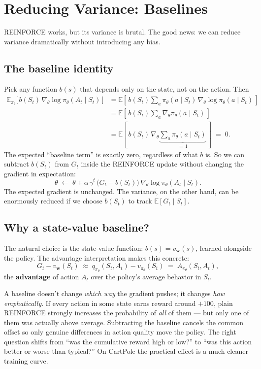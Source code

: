 \documentclass[11pt, oneside]{book}
\newcommand{\E}{\mathbb{E}}              %
\begin{document}
\section{Reducing Variance: Baselines}

REINFORCE works, but its variance is brutal.
The good news: we can reduce variance dramatically without introducing any bias.

\subsection{The baseline identity}

Pick any function $b(s)$ that depends only on the state, not on the action. Then
\begin{align*}
  \E_{\pi_\theta}\!\bigl[\, b(S_t)\, \nabla_\theta \log \pi_\theta(A_t \mid S_t)\, \bigr]
  &= \E\!\left[\, b(S_t) \sum_a \pi_\theta(a \mid S_t)\, \nabla_\theta \log \pi_\theta(a \mid S_t)\, \right] \\
  &= \E\!\left[\, b(S_t) \sum_a \nabla_\theta \pi_\theta(a \mid S_t)\, \right] \\
  &= \E\!\left[\, b(S_t)\, \nabla_\theta \underbrace{\sum_a \pi_\theta(a \mid S_t)}_{=\, 1}\, \right]
  \;=\; 0.
\end{align*}
The expected ``baseline term'' is exactly zero, regardless of what $b$ is.
So we can subtract $b(S_t)$ from $G_t$ inside the REINFORCE update without changing the
gradient in expectation:
\[
  \theta \;\leftarrow\; \theta + \alpha\, \gamma^t\,\bigl(G_t - b(S_t)\bigr)\, \nabla_\theta \log \pi_\theta(A_t \mid S_t).
\]
The expected gradient is unchanged.
The variance, on the other hand, can be enormously reduced if we choose $b(S_t)$ to
track $\E[G_t \mid S_t]$.

\subsection{Why a state-value baseline?}

The natural choice is the state-value function: $b(s) = v_\mathbf{w}(s)$, learned
alongside the policy.
The advantage interpretation makes this concrete:
\[
  G_t - v_\mathbf{w}(S_t) \;\approx\; q_{\pi_\theta}(S_t, A_t) - v_{\pi_\theta}(S_t)
                                 \;=\; A_{\pi_\theta}(S_t, A_t),
\]
the \textbf{advantage} of action $A_t$ over the policy's average behavior in $S_t$.

\begin{intbox}
A baseline doesn't change \emph{which way} the gradient pushes; it changes \emph{how
emphatically}.
If every action in some state earns reward around $+100$, plain REINFORCE strongly
increases the probability of \emph{all} of them --- but only one of them was actually
above average.
Subtracting the baseline cancels the common offset so only genuine differences
in action quality move the policy.
The right question shifts from ``was the cumulative reward high or low?'' to
``was this action better or worse than typical?''
On CartPole the practical effect is a much cleaner training curve.
\end{intbox}
\end{document}
